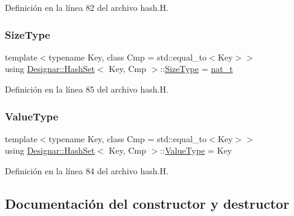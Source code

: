 Definición en la línea 82 del archivo hash.\+H.

\mbox{\label{class_designar_1_1_hash_set_a1bfcb16c2a94c0ab22e15f38b05ba8cc}} 
\subsubsection{\texorpdfstring{Size\+Type}{SizeType}}
{\footnotesize\ttfamily template$<$typename Key, class Cmp = std\+::equal\+\_\+to$<$\+Key$>$$>$ \\
using \hyperlink{class_designar_1_1_hash_set}{Designar\+::\+Hash\+Set}$<$ Key, Cmp $>$\+::\hyperlink{class_designar_1_1_hash_set_a1bfcb16c2a94c0ab22e15f38b05ba8cc}{Size\+Type} =  \hyperlink{namespace_designar_aa72662848b9f4815e7bf31a7cf3e33d1}{nat\+\_\+t}}



Definición en la línea 85 del archivo hash.\+H.

\mbox{\label{class_designar_1_1_hash_set_a4edc6d161470bffb03dad2bbc916b6a0}} 
\subsubsection{\texorpdfstring{Value\+Type}{ValueType}}
{\footnotesize\ttfamily template$<$typename Key, class Cmp = std\+::equal\+\_\+to$<$\+Key$>$$>$ \\
using \hyperlink{class_designar_1_1_hash_set}{Designar\+::\+Hash\+Set}$<$ Key, Cmp $>$\+::\hyperlink{class_designar_1_1_hash_set_a4edc6d161470bffb03dad2bbc916b6a0}{Value\+Type} =  Key}



Definición en la línea 84 del archivo hash.\+H.



\subsection{Documentación del constructor y destructor}
\mbox{\label{class_designar_1_1_hash_set_afb5e932ee4dcc9b1dec4d6eefd810c32}} 
